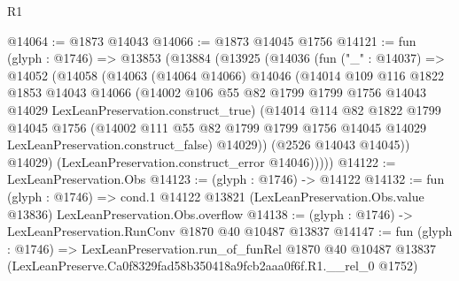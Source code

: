 \begin{lexlean}{R1}
\begin{coremodule}
@14064 := @1873 @14043
@14066 := @1873 @14045 @1756
@14121 := fun (glyph : @1746) =>
  @13853
    (@13884
      (@13925
        (@14036
          (fun ("_" : @14037) =>
          @14052
            (@14058
              (@14063
                (@14064 @14066)
                @14046
                (@14014
                  @109
                  @116
                  @1822
                  @1853
                  @14043
                  @14066
                  (@14002
                    @106
                    @55
                    @82
                    @1799
                    @1799
                    @1756
                    @14043
                    @14029
                    LexLeanPreservation.construct_true)
                  (@14014
                    @114
                    @82
                    @1822
                    @1799
                    @14045
                    @1756
                    (@14002
                      @111
                      @55
                      @82
                      @1799
                      @1799
                      @1756
                      @14045
                      @14029
                      LexLeanPreservation.construct_false)
                    @14029))
                (@2526 @14043 @14045))
              @14029)
            (LexLeanPreservation.construct_error @14046)))))
@14122 := LexLeanPreservation.Obs
@14123 := (glyph : @1746) -> @14122
@14132 := fun (glyph : @1746) =>
  cond.{1} @14122 @13821 (LexLeanPreservation.Obs.value @13836) LexLeanPreservation.Obs.overflow
@14138 := (glyph : @1746) -> LexLeanPreservation.RunConv @1870 @40 @10487 @13837
@14147 := fun (glyph : @1746) =>
  LexLeanPreservation.run_of_funRel
    @1870
    @40
    @10487
    @13837
    (LexLeanPreserve.Ca0f8329fad58b350418a9fcb2aaa0f6f.R1.__rel_0 @1752)
\end{coremodule}
\end{lexlean}
